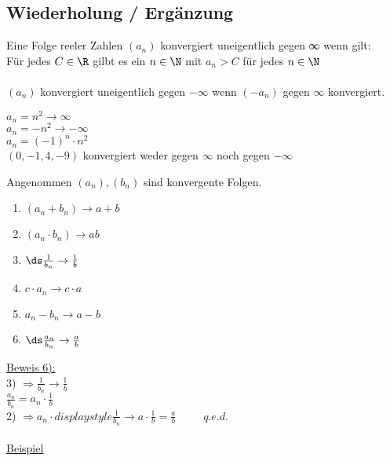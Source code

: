 


\setcounter{chapter}{3}
\setcounter{section}{9}

\subsection*{Wiederholung / Ergänzung}
Eine Folge reeler Zahlen $(a_n)$ konvergiert uneigentlich gegen ∞ wenn gilt:\\
Für jedes $C \in \R$ gilbt es ein $n \in\N$ mit $a_n > C$ für jedes $n \in\N$\\
\\
$(a_n)$ konvergiert uneigentlich gegen $- \infty$ wenn $(-a_n)$ gegen $\infty$ konvergiert.\\


\bsp
$a_n = n^2 \to \infty$\\
$a_n = -n^2 \to -\infty$\\
$a_n = (-1)^n \cdot n^2$\\
$(0, -1, 4, -9)$ konvergiert weder gegen $\infty$ noch gegen $ - \infty$

Angenommen $(a_n), (b_n)$ sind konvergente Folgen.\\
\begin{enumerate}
\item{$(a_n + b_n) \to a + b$}
\item{$(a_n \cdot b_n) \to ab$}
\item{$\ds\frac{1}{b_n} \to \frac{1}{b}$}
\item{$c \cdot a_n \to c \cdot a$}
\item{$a_n - b_n \to a - b$}
\item{$\ds\frac{a_n}{b_n} \to \frac{a}{b}$}
\end{enumerate}

\noindent \underline{Beweis 6):}\\
3) $\Rightarrow \displaystyle\frac{1}{b_n} \to \displaystyle\frac{1}{b}$\\
$\displaystyle\frac{a_n}{b_n} = a_n \cdot \displaystyle\frac{1}{b}$\\
2) $\Rightarrow a_n \cdot displaystyle\frac{1}{b_n} \to a \cdot \displaystyle\frac{1}{b} = \displaystyle\frac{a}{b} \phantom{XXX} q.e.d.$\\ \\
\underline{Beispiel}\\\\

